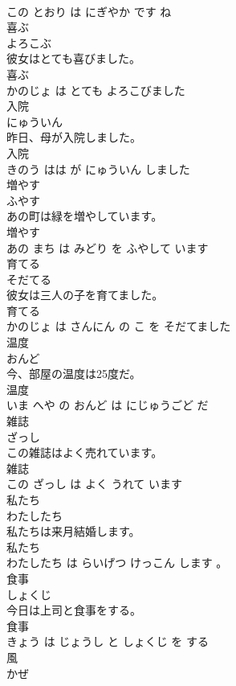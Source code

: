 \documentclass[8pt]{extreport}
\begin{document}
\begin{CJK}{UTF8}{min}
\\	この とおり は にぎやか です ね			
\\	喜ぶ	
\\	よろこぶ			
\\	彼女はとても喜びました。	
\\	喜ぶ 
\\	かのじょ は とても よろこびました			
\\	入院	
\\	にゅういん			
\\	昨日、母が入院しました。	
\\	入院 
\\	きのう はは が にゅういん しました			
\\	増やす	
\\	ふやす			
\\	あの町は緑を増やしています。	
\\	増やす 
\\	あの まち は みどり を ふやして います			
\\	育てる	
\\	そだてる			
\\	彼女は三人の子を育てました。	
\\	育てる 
\\	かのじょ は さんにん の こ を そだてました			
\\	温度	
\\	おんど			
\\	今、部屋の温度は25度だ。	
\\	温度 
\\	いま へや の おんど は にじゅうごど だ			
\\	雑誌	
\\	ざっし			
\\	この雑誌はよく売れています。	
\\	雑誌 
\\	この ざっし は よく うれて います			
\\	私たち	
\\	わたしたち			
\\	私たちは来月結婚します。	
\\	私たち 
\\	わたしたち は らいげつ けっこん します 。			
\\	食事	
\\	しょくじ			
\\	今日は上司と食事をする。	
\\	食事 
\\	きょう は じょうし と しょくじ を する			
\\	風	
\\	かぜ			

\end{CJK}
\end{document}
